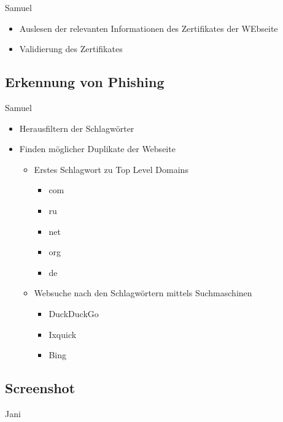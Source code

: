 \todo Samuel

\begin{itemize}
  \item Auslesen der relevanten Informationen des Zertifikates der WEbseite
  \item Validierung des Zertifikates
\end{itemize}

\subsection{Erkennung von Phishing}

\todo Samuel

\begin{itemize}
  \item Herausfiltern der Schlagwörter
  \item Finden möglicher Duplikate der Webseite
  \begin{itemize}
    \item Erstes Schlagwort zu Top Level Domains
    \begin{itemize}
      \item com
      \item ru
      \item net
      \item org
      \item de
    \end{itemize}
    \item Websuche nach den Schlagwörtern mittels Suchmaschinen
    \begin{itemize}
      \item DuckDuckGo
      \item Ixquick
      \item Bing
    \end{itemize}
  \end{itemize}
\end{itemize}

\subsection{Screenshot}

\todo Jani
